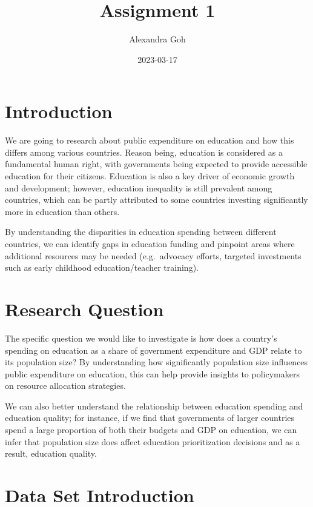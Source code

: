 \documentclass[
]{article}
\title{\textbf{Assignment 1}}
\author{Alexandra Goh}
\date{2023-03-17}
\begin{document}
\maketitle

{
\setcounter{tocdepth}{2}
\tableofcontents
}
\hypertarget{introduction}{%
\section{\texorpdfstring{\textbf{Introduction}}{Introduction}}\label{introduction}}

We are going to research about public expenditure on education and how this differs among various countries. Reason being, education is considered as a fundamental human right, with governments being expected to provide accessible education for their citizens. Education is also a key driver of economic growth and development; however, education inequality is still prevalent among countries, which can be partly attributed to some countries investing significantly more in education than others.

By understanding the disparities in education spending between different countries, we can identify gaps in education funding and pinpoint areas where additional resources may be needed (e.g.~advocacy efforts, targeted investments such as early childhood education/teacher training).

\hypertarget{research-question}{%
\section{\texorpdfstring{\textbf{Research Question}}{Research Question}}\label{research-question}}

The specific question we would like to investigate is how does a country's spending on education as a share of government expenditure and GDP relate to its population size? By understanding how significantly population size influences public expenditure on education, this can help provide insights to policymakers on resource allocation strategies.

We can also better understand the relationship between education spending and education quality; for instance, if we find that governments of larger countries spend a large proportion of both their budgets and GDP on education, we can infer that population size does affect education prioritization decisions and as a result, education quality.

\hypertarget{data-set-introduction}{%
\section{\texorpdfstring{\textbf{Data Set Introduction}}{Data Set Introduction}}\label{data-set-introduction}}
\end{document}
